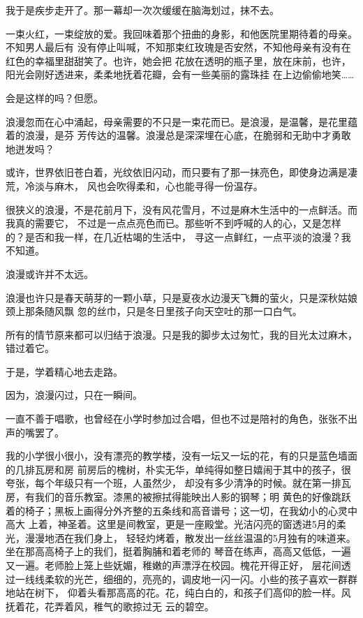 		我于是疾步走开了。那一幕却一次次缓缓在脑海划过，抹不去。

		一束火红，一束绽放的爱。我回味着那个扭曲的身影，和他医院里期待着的母亲。不知男人最后有
	没有停止叫喊，不知那束红玫瑰是否安然，不知他母亲有没有在红色的幸福里甜甜笑了。也许，她会把
	花放在透明的瓶子里，放在床前，也许，阳光会刚好透进来，柔柔地抚着花瓣，会有一些美丽的露珠挂
	在上边偷偷地笑……

		会是这样的吗？但愿。

		浪漫忽而在心中涌起，母亲需要的不只是一束花而已。是浪漫，是温馨，是花里蕴着的浪漫，是芬
	芳传达的温馨。浪漫总是深深埋在心底，在脆弱和无助中才勇敢地迸发吗？

		或许，世界依旧苍白着，光纹依旧闪动，而只要有了那一抹亮色，即使身边满是凄荒，冷淡与麻木，
	风也会吹得柔和，心也能寻得一份温存。

		很狭义的浪漫，不是花前月下，没有风花雪月，不过是麻木生活中的一点鲜活。而我真的需要它，
	不过是一点点亮色而已。那些听不到呼喊的人的心，又是怎样的？是否和我一样，在几近枯竭的生活中，
	寻这一点鲜红，一点平淡的浪漫？我不知道。

		浪漫或许并不太远。

		浪漫也许只是春天萌芽的一颗小草，只是夏夜水边漫天飞舞的萤火，只是深秋姑娘颈上那条随风飘
	忽的丝巾，只是冬日里孩子向天空吐的那一口白气。

		所有的情节原来都可以归结于浪漫。只是我的脚步太过匆忙，我的目光太过麻木，错过着它。

		于是，学着精心地去走路。

		因为，浪漫闪过，只在一瞬间。

	\endwriting



		一直不善于唱歌，也曾经在小学时参加过合唱，但也不过是陪衬的角色，张张不出声的嘴罢了。

		我的小学很小很小，没有漂亮的教学楼，没有一坛又一坛的花，有的只是蓝色墙面的几排瓦房和房
	前房后的槐树，朴实无华，单纯得如整日嬉闹于其中的孩子，很夸张，每个年级只有一个班，人虽然少，
	却没有多少清净的时候。就在第一排瓦房，有我们的音乐教室。漆黑的被擦拭得能映出人影的钢琴；明
	黄色的好像跳跃着的椅子；黑板上画得分外齐整的五条线和高音谱号；这一切，在我幼小的心灵中高大
	上着，神圣着。这里是间教室，更是一座殿堂。光洁闪亮的窗透进5月的柔光，漫漫地洒在我们身上，
	轻轻灼烤着，散发出一丝丝温温的5月独有的味道来。坐在那高高椅子上的我们，挺着胸脯和着老师的
	琴音在练声，高高又低低，一遍又一遍。老师脸上笼上些妩媚，稚嫩的声漂浮在校园。槐花开得正好，
	层花间透过一线线柔软的光芒，细细的，亮亮的，调皮地一闪一闪。小些的孩子喜欢一群群地站在树下，
	仰着头看那高高的花。花，纯白白的，和孩子们高仰的脸一样。风抚着花，花弄着风，稚气的歌掠过无
	云的碧空。


